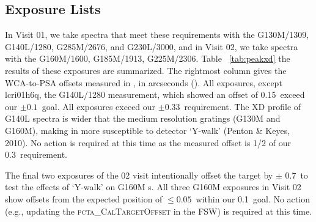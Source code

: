 \subsection{Exposure Lists}\label{subsec:elists}

In Visit 01, we take spectra that meet these requirements with the G130M/1309, G140L/1280, G285M/2676, and G230L/3000, and in Visit 02,
we take spectra with the G160M/1600, G185M/1913, G225M/2306. Table ~\ref{tab:peakxd} the results of these exposures are summarized.
The rightmost column gives the WCA-to-PSA offsets measured in , in arcseconds (\arcsec).
All exposures, except {\sf lcri01h6q}, the G140L/1280 measurement, which showed an offset of 0.15\arcsec\ exceed our $\pm 0.1$\arcsec\ goal.
All exposures exceed our $\pm 0.33$\arcsec\ requirement. The XD profile of G140L spectra is wider that the medium
resolution gratings (G130M and G160M), making in more susceptible to detector `Y-walk' (Penton \& Keyes, 2010).
No action is required at this time as the measured offset is 1/2 of our 0.3\arcsec\ requirement.

The final two exposures of the 02 visit intentionally offset the target by $\pm$ 0.7\arcsec\ to test the effects
of `Y-walk' on G160M s. All three G160M exposures in Visit 02 show offsets from the expected position
of $\le 0.05$\arcsec\ within our 0.1\arcsec\ goal. No action (e.g., updating the \textsc{pcta\_CalTargetOffset} in the FSW)
is required at this time.



